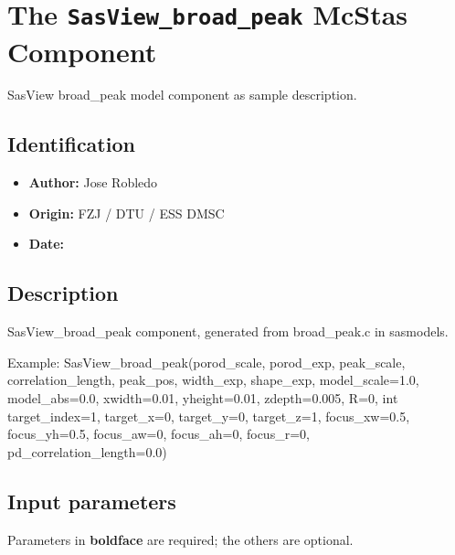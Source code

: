 \section{The \texttt{SasView\_broad\_peak} McStas Component}
SasView broad\_peak model component as sample description.

\subsection*{Identification}
\begin{itemize}
  \item \textbf{Author:} Jose Robledo
  \item \textbf{Origin:} FZJ / DTU / ESS DMSC
  \item \textbf{Date:} 
\end{itemize}

\subsection*{Description}
SasView\_broad\_peak component, generated from broad\_peak.c in sasmodels.

Example: SasView\_broad\_peak(porod\_scale, porod\_exp, peak\_scale, correlation\_length, peak\_pos, width\_exp, shape\_exp, model\_scale=1.0, model\_abs=0.0, xwidth=0.01, yheight=0.01, zdepth=0.005, R=0, int target\_index=1, target\_x=0, target\_y=0, target\_z=1, focus\_xw=0.5, focus\_yh=0.5, focus\_aw=0, focus\_ah=0, focus\_r=0, pd\_correlation\_length=0.0)

\subsection*{Input parameters}
Parameters in \textbf{boldface} are required; the others are optional.

